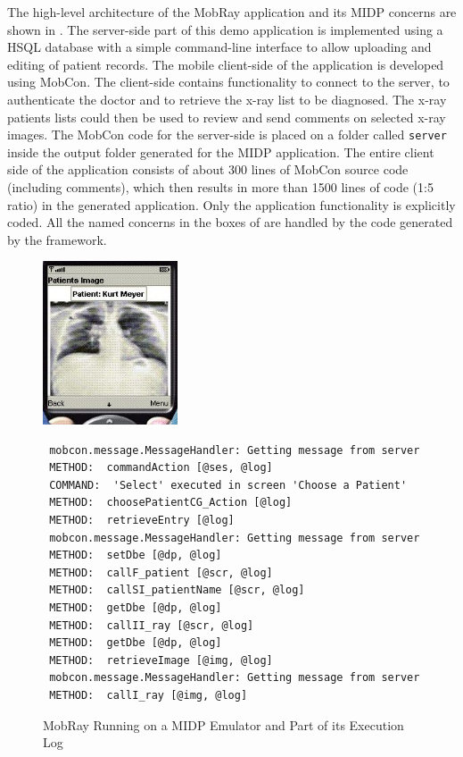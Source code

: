 The high-level architecture of the MobRay application and its MIDP concerns are shown in . The server-side part of this demo application is implemented using a HSQL database \cite{www.hsql} with a simple command-line interface to allow uploading and editing of patient records. The mobile client-side of the application is developed using MobCon. The client-side contains functionality to connect to the server, to authenticate the doctor and to retrieve the x-ray list to be diagnosed. The x-ray patients lists could then be used to review and send comments on selected x-ray images. The MobCon code for the server-side is placed on a folder called \texttt{server} inside the output folder generated for the MIDP application.
%
The entire client side of the application consists of about 300 lines of MobCon source code (including comments), which then results in more than 1500 lines of code (1:5 ratio) in the generated application. Only the application functionality is explicitly coded. All the named concerns in the boxes of  are handled by the code generated by the framework. 

\begin{figure}[ht]
	\begin{center}
	\begin{minipage}{4cm}
		\includegraphics[width=4cm,height=!]{ch05/mobray1}
	\end{minipage}\hspace{0.5cm}%
	\begin{minipage}{8cm}
	\begin{tiny}
	\begin{verbatim}
 mobcon.message.MessageHandler: Getting message from server
 METHOD:  commandAction [@ses, @log]
 COMMAND:  'Select' executed in screen 'Choose a Patient'
 METHOD:  choosePatientCG_Action [@log]
 METHOD:  retrieveEntry [@log]
 mobcon.message.MessageHandler: Getting message from server
 METHOD:  setDbe [@dp, @log]
 METHOD:  callF_patient [@scr, @log]
 METHOD:  callSI_patientName [@scr, @log]
 METHOD:  getDbe [@dp, @log]
 METHOD:  callII_ray [@scr, @log]
 METHOD:  getDbe [@dp, @log]
 METHOD:  retrieveImage [@img, @log]
 mobcon.message.MessageHandler: Getting message from server
 METHOD:  callI_ray [@img, @log]
	\end{verbatim}
	\end{tiny}
	\end{minipage}
	\end{center}
	\caption{MobRay Running on a MIDP Emulator and Part of its Execution Log}
	\label{fig:mobray}
\end{figure}

